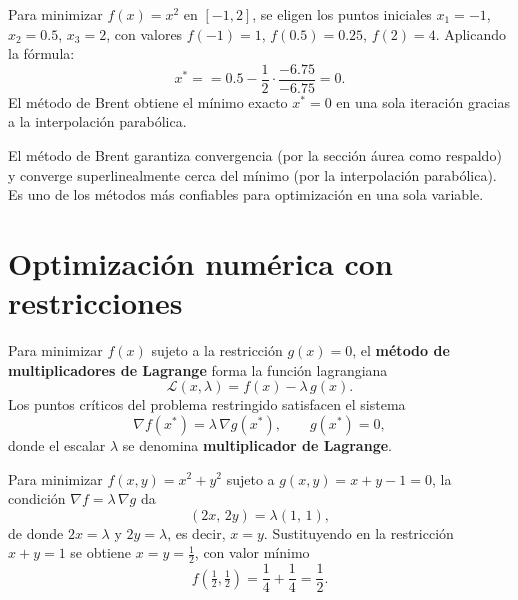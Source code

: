 \documentclass[a4,11pt]{aleph-notas}
\begin{document}
\begin{ejem}
    Para minimizar $f(x)=x^2$ en $[-1,2]$, se eligen los puntos iniciales $x_1=-1$, $x_2=0.5$, $x_3=2$, con valores $f(-1)=1$, $f(0.5)=0.25$, $f(2)=4$. Aplicando la fórmula:
    \[
        x^*
        =
        =
        0.5
        -
        \frac{1}{2}
        \cdot
        \frac{-6.75}{-6.75}
        =
        0.
    \]
    El método de Brent obtiene el mínimo exacto $x^*=0$ en una sola iteración gracias a la interpolación parabólica.
\end{ejem}

\begin{advertencia}
    El método de Brent garantiza convergencia (por la sección áurea como respaldo) y converge superlinealmente cerca del mínimo (por la interpolación parabólica). Es uno de los métodos más confiables para optimización en una sola variable.
\end{advertencia}


\section{Optimización numérica con restricciones}

\begin{defi}
    Para minimizar $f({x})$ sujeto a la restricción $g({x})=0$, el \textbf{método de multiplicadores de Lagrange} forma la función lagrangiana
    \[
        \mathcal{L}({x},\lambda)=f({x})-\lambda\,g({x}).
    \]
    Los puntos críticos del problema restringido satisfacen el sistema
    \[
        \nabla f({x}^*)=\lambda\,\nabla g({x}^*),
        \qquad
        g({x}^*)=0,
    \]
    donde el escalar $\lambda$ se denomina \textbf{multiplicador de Lagrange}.
\end{defi}

\begin{ejem}
    Para minimizar $f(x,y)=x^2+y^2$ sujeto a $g(x,y)=x+y-1=0$, la condición $\nabla f=\lambda\,\nabla g$ da
    \[
        (2x,\,2y)=\lambda(1,\,1),
    \]
    de donde $2x=\lambda$ y $2y=\lambda$, es decir, $x=y$. Sustituyendo en la restricción $x+y=1$ se obtiene $x=y=\tfrac{1}{2}$, con valor mínimo
    \[
        f\!\left(\tfrac{1}{2},\tfrac{1}{2}\right)=\frac{1}{4}+\frac{1}{4}=\frac{1}{2}.
    \]
\end{ejem}
\end{document}
